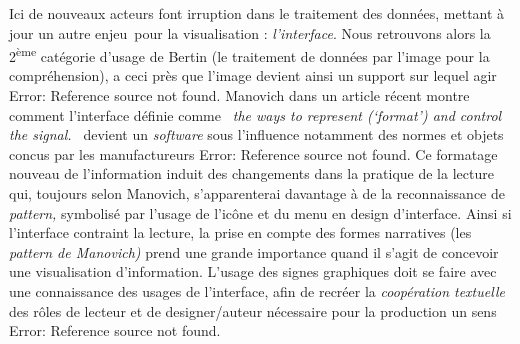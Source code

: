 {\color{black}
\textsf{Ici de nouveaux acteurs font irruption dans le traitement des donn\'ees, mettant \`a jour un autre enjeu~pour la
visualisation : }\textsf{\textit{l'interface}}\textsf{. Nous retrouvons alors la
2}\textsf{\textsuperscript{\`eme}}\textsf{ cat\'egorie d'usage de Bertin (le traitement de donn\'ees par l'image pour
la compr\'ehension), a ceci pr\`es que l'image devient ainsi un support sur lequel agir }\textsf{Error: Reference
source not found}\textsf{. Manovich dans un article r\'ecent montre comment l'interface d\'efinie comme
}\textsf{\textit{{\guillemotleft}~the ways to represent (`format') and control the signal.~{\guillemotright}
}}\textsf{devient un }\textsf{\textit{software}}\textsf{ sous l'influence notamment des normes et objets concus par les
manufactureurs }\textsf{Error: Reference source not found}\textsf{. Ce formatage nouveau de l'information induit des
changements dans la pratique de la lecture qui, toujours selon Manovich, s'apparenterai davantage \`a de la
reconnaissance de }\textsf{\textit{pattern, }}\textsf{symbolis\'e par l'usage de l'ic\^one et du menu en design
d'interface. Ainsi si l'interface contraint la lecture, la prise en compte des formes narratives (les
}\textsf{\textit{pattern de Manovich)}}\textsf{ prend une grande importance quand il s'agit de concevoir une
visualisation d'information. L'usage des signes graphiques doit se faire avec une connaissance des usages de
l'interface, afin de recr\'eer la }\textsf{\textit{coop\'eration textuelle}}\textsf{ des r\^oles de lecteur et de
designer/auteur n\'ecessaire pour la production un sens }\textsf{Error: Reference source not found}\textsf{. }}


\bigskip


\bigskip

